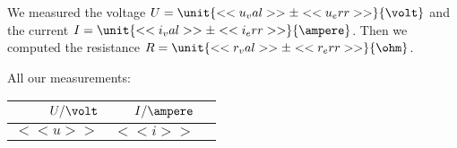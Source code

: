 We measured the voltage $U = \unit{<< u_val >> \pm << u_err >>}{\volt}$ and the
current $I = \unit{<< i_val >> \pm << i_err >>}{\ampere}$. Then we computed the
resistance $R = \unit{<< r_val >> \pm << r_err >>}{\ohm}$.


All our measurements:
\begin{table}[h]
    \begin{tabular}{rrr}
        $U/\volt$ & $I/\ampere$ \\
        \hline
        $<< u >>$ & $<< i >>$ \\
    \end{tabular}
\end{table}

